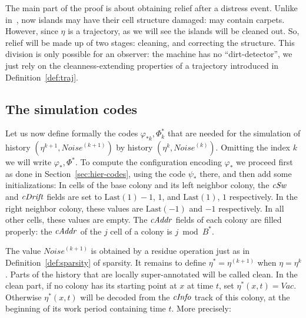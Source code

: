 \documentclass[12pt]{memoir}
\newcommand{\authnote}[3]
{\text{{ \textcolor{#3}{\( \langle\hspace{-0.2em}\langle \)\textsf{\footnotesize #1: #2}\( \rangle\hspace{-0.2em}\rangle \)}}}}
\newcommand{\authnote}[2]{}
\newcommand{\Pnote}[1]{{\authnote{P}{#1}{cyan}}}
\newcommand{\fld}[1]{\ensuremath{\textit{#1\/}}}
\def\B{B}
\newcommand{\Vacant}{\mathit{Vac}}
\newcommand{\Noise}{\mathit{Noise}}
\newcommand{\cAddr}{\fld{cAddr}}
\newcommand{\cDrift}{\fld{cDrift}}
\newcommand{\cInfo}{\fld{cInfo}}
\newcommand{\cSweep}{\fld{cSw}}
\newcommand{\Last}{\mathrm{Last}}
\begin{document}
The main part of the proof is about obtaining relief  after a distress event.
Unlike in~\cite{burstyTuring13}, now islands 
may have their cell structure damaged: may contain carpets.
However, since \( \eta \) is a trajectory, as we will see the islands will be cleaned out.
So, relief will be made up of two stages: cleaning, and correcting the structure.
This division is only possible for an observer: the machine has no
``dirt-detector'', we just rely on the cleanness-extending properties of a
trajectory introduced in Definition~\ref{def:traj}.


\subsection{The simulation codes}\label{sec:sim-codes}

Let us now define formally the codes \( \varphi_{*k},\Phi_{k}^{*} \) that are needed
for the simulation of history \( (\eta^{k+1},\Noise^{(k+1)}) \) by history \( (\eta^{k},\Noise^{(k)}) \).
Omitting the index \( k \) we will write \( \varphi_{*},\Phi^{*} \).
To compute the configuration encoding \( \varphi_{*} \) we proceed first as
done in Section~\ref{sec:hier-codes}, using the code \( \psi_{*} \) there,
and then add some initializations:
In cells of the base colony and its left neighbor  colony,
the \( \cSweep \) and \( \cDrift \) fields are set 
to \( \Last(1)-1 \),  \( 1 \), and \( \Last(1) \),  \( 1 \) respectively.
In the right neighbor colony, these values are \( \Last(-1) \) and \( -1 \) respectively.
In all other cells, these values are empty.
The \( \cAddr \) fields of each colony are filled properly:
the \( \cAddr \) of the \( j \) cell of a colony
is \( j \bmod \B^* \). \Pnote{Picture?}

The value \( \Noise^{(k+1)} \) is obtained by a residue operation
just as in Definition~\ref{def:sparsity} of sparsity.
It remains to define \( \eta^{*}=\eta^{(k+1)} \) when \( \eta=\eta^{k} \).
Parts of the history that are locally super-annotated will be called clean.
In the clean part,
if no colony has its starting point at \( x \) at time \( t \), set \( \eta^{*}(x,t)=\Vacant \).
Otherwise \( \eta^{*}(x,t) \) will be decoded from
the \( \cInfo \) track of this colony, at the beginning of its work period 
containing time \( t \).
More precisely:
\end{document}
